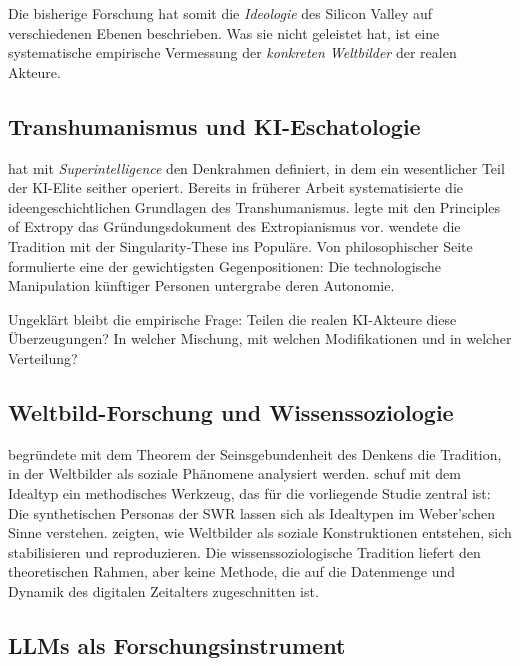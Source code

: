 \documentclass[12pt,a4paper]{article}
\begin{document}
Die bisherige Forschung hat somit die \emph{Ideologie} des Silicon Valley auf verschiedenen Ebenen beschrieben. Was sie nicht geleistet hat, ist eine systematische empirische Vermessung der \emph{konkreten Weltbilder} der realen Akteure.


\subsection{Transhumanismus und KI-Eschatologie}
\label{sec:forschungsstand:transhumanismus}

\citet{Bostrom2014} hat mit \emph{Superintelligence} den Denkrahmen definiert, in dem ein wesentlicher Teil der KI-Elite seither operiert. Bereits in fr\"uherer Arbeit systematisierte \citet{Bostrom2005} die ideengeschichtlichen Grundlagen des Transhumanismus. \citet{More2003} legte mit den \glqq Principles of Extropy\grqq{} das Gr\"undungsdokument des Extropianismus vor. \citet{Kurzweil2005} wendete die Tradition mit der Singularity-These ins Popul\"are. Von philosophischer Seite formulierte \citet{Habermas2001} eine der gewichtigsten Gegenpositionen: Die technologische Manipulation k\"unftiger Personen untergrabe deren Autonomie.

Ungekl\"art bleibt die empirische Frage: Teilen die realen KI-Akteure diese \"Uberzeugungen? In welcher Mischung, mit welchen Modifikationen und in welcher Verteilung?


\subsection{Weltbild-Forschung und Wissenssoziologie}
\label{sec:forschungsstand:wissenssoziologie}

\citet{Mannheim1929} begr\"undete mit dem Theorem der \glqq Seinsgebundenheit des Denkens\grqq{} die Tradition, in der Weltbilder als soziale Ph\"anomene analysiert werden. \citet{Weber1904} schuf mit dem Idealtyp ein methodisches Werkzeug, das f\"ur die vorliegende Studie zentral ist: Die synthetischen Personas der SWR lassen sich als Idealtypen im Weber'schen Sinne verstehen. \citet{BergerLuckmann1966} zeigten, wie Weltbilder als soziale Konstruktionen entstehen, sich stabilisieren und reproduzieren. Die wissenssoziologische Tradition liefert den theoretischen Rahmen, aber keine Methode, die auf die Datenmenge und Dynamik des digitalen Zeitalters zugeschnitten ist.


\subsection{LLMs als Forschungsinstrument}
\label{sec:forschungsstand:llm}
\end{document}

